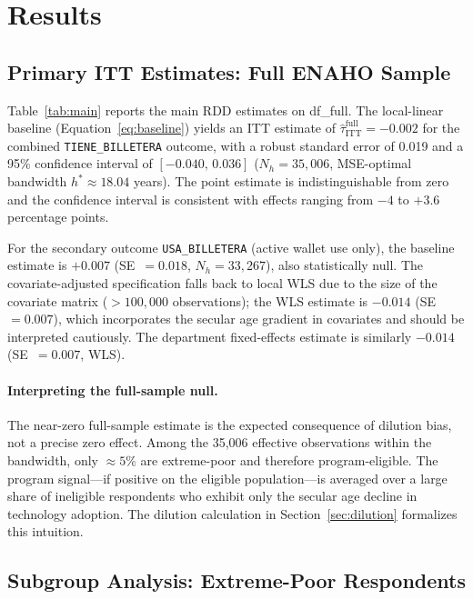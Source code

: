 \documentclass[12pt]{article}
\begin{document}
\section{Results}
\label{sec:results}

\subsection{Primary ITT Estimates: Full ENAHO Sample}
\label{subsec:main}

Table~\ref{tab:main} reports the main RDD estimates on df\_full. The
local-linear baseline (Equation~\ref{eq:baseline}) yields an ITT estimate
of $\hat{\tau}_{\text{ITT}}^{\text{full}} = -0.002$ for the combined
\texttt{TIENE\_BILLETERA} outcome, with a robust standard error of 0.019
and a 95\% confidence interval of $[-0.040,\,0.036]$ ($N_h\!=\!35{,}006$,
MSE-optimal bandwidth $h^{*}\!\approx\!18.04$ years). The point estimate is
indistinguishable from zero and the confidence interval is consistent with
effects ranging from $-4$ to $+3.6$ percentage points.

For the secondary outcome \texttt{USA\_BILLETERA} (active wallet use only),
the baseline estimate is $+0.007$ (SE~$=0.018$, $N_h\!=\!33{,}267$), also
statistically null. The covariate-adjusted specification falls back to local
WLS due to the size of the covariate matrix ($>100{,}000$ observations);
the WLS estimate is $-0.014$ (SE~$=0.007$), which incorporates the secular
age gradient in covariates and should be interpreted cautiously. The
department fixed-effects estimate is similarly $-0.014$ (SE~$=0.007$, WLS).

\paragraph{Interpreting the full-sample null.}
The near-zero full-sample estimate is the expected consequence of dilution
bias, not a precise zero effect. Among the 35,006 effective observations
within the bandwidth, only $\approx\!5\%$ are extreme-poor and therefore
program-eligible. The program signal---if positive on the eligible
population---is averaged over a large share of ineligible respondents who
exhibit only the secular age decline in technology adoption. The dilution
calculation in Section~\ref{sec:dilution} formalizes this intuition.

\subsection{Subgroup Analysis: Extreme-Poor Respondents}
\label{subsec:ep_subgroup}
\end{document}
